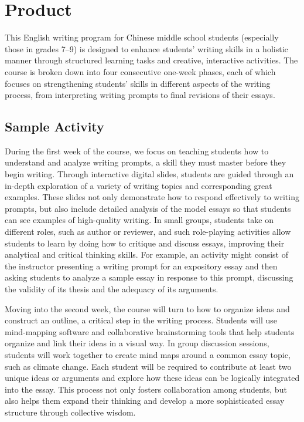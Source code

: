 \documentclass[11pt]{article}
\begin{document}
\section{Product}

This English writing program for Chinese middle school students (especially those in grades 7--9) is designed to enhance students' writing skills in a holistic manner through structured learning tasks and creative, interactive activities. The course is broken down into four consecutive one-week phases, each of which focuses on strengthening students' skills in different aspects of the writing process, from interpreting writing prompts to final revisions of their essays.

\subsection{Sample Activity}

During the first week of the course, we focus on teaching students how to understand and analyze writing prompts, a skill they must master before they begin writing. Through interactive digital slides, students are guided through an in-depth exploration of a variety of writing topics and corresponding great examples. These slides not only demonstrate how to respond effectively to writing prompts, but also include detailed analysis of the model essays so that students can see examples of high-quality writing. In small groups, students take on different roles, such as author or reviewer, and such role-playing activities allow students to learn by doing how to critique and discuss essays, improving their analytical and critical thinking skills. For example, an activity might consist of the instructor presenting a writing prompt for an expository essay and then asking students to analyze a sample essay in response to this prompt, discussing the validity of its thesis and the adequacy of its arguments.

Moving into the second week, the course will turn to how to organize ideas and construct an outline, a critical step in the writing process. Students will use mind-mapping software and collaborative brainstorming tools that help students organize and link their ideas in a visual way. In group discussion sessions, students will work together to create mind maps around a common essay topic, such as climate change. Each student will be required to contribute at least two unique ideas or arguments and explore how these ideas can be logically integrated into the essay. This process not only fosters collaboration among students, but also helps them expand their thinking and develop a more sophisticated essay structure through collective wisdom.
\end{document}
